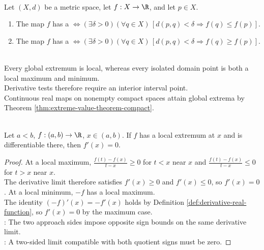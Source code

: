 \begin{definition} \label{def:local-extrema} \\
Let $(X,d)$ be a metric space, let $f:X\to\R$, and let $p\in X$.
\begin{enumerate}[label=(\roman*)]
\setlength{\itemsep}{0pt}
\item The map $f$ has a  $\Longleftrightarrow(\exists\delta>0)(\forall q\in X)\,[d(p,q)<\delta\Longrightarrow f(q)\leq f(p)]$.
\item The map $f$ has a  $\Longleftrightarrow(\exists\delta>0)(\forall q\in X)\,[d(p,q)<\delta\Longrightarrow f(q)\geq f(p)]$.
\end{enumerate}
\end{definition}

\begin{remark} \label{rem:local-versus-global-extrema} \\
Every global extremum is local, whereas every isolated domain point is both a local maximum and minimum.\\
Derivative tests therefore require an interior interval point.\\
Continuous real maps on nonempty compact spaces attain global extrema by Theorem \ref{thm:extreme-value-theorem-compact}.
\end{remark}

\begin{theorem} \label{thm:interior-extremum-derivative-zero} \\
Let $a<b$, $f:(a,b)\to\R$, $x\in(a,b)$. If $f$ has a local extremum at $x$ and is differentiable there, then $f'(x)=0$.
\begin{proof}
At a local maximum, $\frac{f(t)-f(x)}{t-x}\geq0$ for $t<x$ near $x$ and $\frac{f(t)-f(x)}{t-x}\leq0$ for $t>x$ near $x$.\\
The derivative limit therefore satisfies $f'(x)\geq0$ and $f'(x)\leq0$, so $f'(x)=0$. At a local minimum, $-f$ has a local maximum.\\
The identity $(-f)'(x)=-f'(x)$ holds by Definition \ref{def:derivative-real-function}, so $f'(x)=0$ by the maximum case.\\
: The two approach sides impose opposite sign bounds on the same derivative limit.\\
: A two-sided limit compatible with both quotient signs must be zero.
\end{proof}
\end{theorem}


